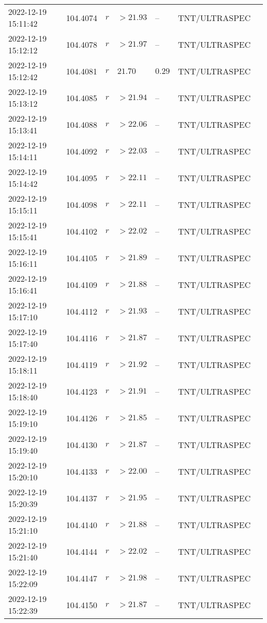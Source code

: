 \documentclass{nature_plusfigure}
\begin{document}
\begin{supplement}
\begin{center}
\begin{longtable}{lllllll}
2022-12-19 15:11:42 & 104.4074 & $r$ & $>21.93$ & -- & TNT/ULTRASPEC &  \\ 
2022-12-19 15:12:12 & 104.4078 & $r$ & $>21.97$ & -- & TNT/ULTRASPEC &  \\ 
2022-12-19 15:12:42 & 104.4081 & $r$ & $21.70$ & $0.29$ & TNT/ULTRASPEC &  \\ 
2022-12-19 15:13:12 & 104.4085 & $r$ & $>21.94$ & -- & TNT/ULTRASPEC &  \\ 
2022-12-19 15:13:41 & 104.4088 & $r$ & $>22.06$ & -- & TNT/ULTRASPEC &  \\ 
2022-12-19 15:14:11 & 104.4092 & $r$ & $>22.03$ & -- & TNT/ULTRASPEC &  \\ 
2022-12-19 15:14:42 & 104.4095 & $r$ & $>22.11$ & -- & TNT/ULTRASPEC &  \\ 
2022-12-19 15:15:11 & 104.4098 & $r$ & $>22.11$ & -- & TNT/ULTRASPEC &  \\ 
2022-12-19 15:15:41 & 104.4102 & $r$ & $>22.02$ & -- & TNT/ULTRASPEC &  \\ 
2022-12-19 15:16:11 & 104.4105 & $r$ & $>21.89$ & -- & TNT/ULTRASPEC &  \\ 
2022-12-19 15:16:41 & 104.4109 & $r$ & $>21.88$ & -- & TNT/ULTRASPEC &  \\ 
2022-12-19 15:17:10 & 104.4112 & $r$ & $>21.93$ & -- & TNT/ULTRASPEC &  \\ 
2022-12-19 15:17:40 & 104.4116 & $r$ & $>21.87$ & -- & TNT/ULTRASPEC &  \\ 
2022-12-19 15:18:11 & 104.4119 & $r$ & $>21.92$ & -- & TNT/ULTRASPEC &  \\ 
2022-12-19 15:18:40 & 104.4123 & $r$ & $>21.91$ & -- & TNT/ULTRASPEC &  \\ 
2022-12-19 15:19:10 & 104.4126 & $r$ & $>21.85$ & -- & TNT/ULTRASPEC &  \\ 
2022-12-19 15:19:40 & 104.4130 & $r$ & $>21.87$ & -- & TNT/ULTRASPEC &  \\ 
2022-12-19 15:20:10 & 104.4133 & $r$ & $>22.00$ & -- & TNT/ULTRASPEC &  \\ 
2022-12-19 15:20:39 & 104.4137 & $r$ & $>21.95$ & -- & TNT/ULTRASPEC &  \\ 
2022-12-19 15:21:10 & 104.4140 & $r$ & $>21.88$ & -- & TNT/ULTRASPEC &  \\ 
2022-12-19 15:21:40 & 104.4144 & $r$ & $>22.02$ & -- & TNT/ULTRASPEC &  \\ 
2022-12-19 15:22:09 & 104.4147 & $r$ & $>21.98$ & -- & TNT/ULTRASPEC &  \\ 
2022-12-19 15:22:39 & 104.4150 & $r$ & $>21.87$ & -- & TNT/ULTRASPEC &  \\ 

\end{longtable}
\end{center}
\end{supplement}
\end{document}
